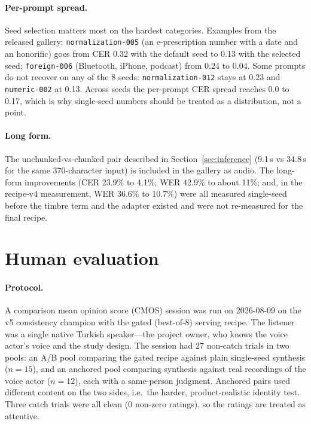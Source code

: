 \documentclass[10pt,twocolumn]{article}
\newcommand{\code}[1]{\texttt{#1}}
\begin{document}
\paragraph{Per-prompt spread.} Seed selection matters most on the hardest categories. Examples from the released gallery: \code{normalization-005} (an e-prescription number with a date and an honorific) goes from CER 0.32 with the default seed to 0.13 with the selected seed; \code{foreign-006} (Bluetooth, iPhone, podcast) from 0.24 to 0.04. Some prompts do not recover on any of the 8 seeds: \code{normalization-012} stays at 0.23 and \code{numeric-002} at 0.13. Across seeds the per-prompt CER spread reaches 0.0 to 0.17, which is why single-seed numbers should be treated as a distribution, not a point.

\paragraph{Long form.} The unchunked-vs-chunked pair described in Section~\ref{sec:inference} (9.1\,s vs 34.8\,s for the same 370-character input) is included in the gallery as audio. The long-form improvements (CER 23.9\% to 4.1\%; WER 42.9\% to about 11\%; and, in the recipe-v4 measurement, WER 36.6\% to 10.7\%) were all measured single-seed before the timbre term and the adapter existed and were not re-measured for the final recipe.

\section{Human evaluation}
\label{sec:human}

\paragraph{Protocol.} A comparison mean opinion score (CMOS) session was run on 2026-08-09 on the v5 consistency champion with the gated (best-of-8) serving recipe. The listener was a single native Turkish speaker---the project owner, who knows the voice actor's voice and the study design. The session had 27 non-catch trials in two pools: an A/B pool comparing the gated recipe against plain single-seed synthesis ($n=15$), and an anchored pool comparing synthesis against real recordings of the voice actor ($n=12$), each with a same-person judgment. Anchored pairs used different content on the two sides, i.e.\ the harder, product-realistic identity test. Three catch trials were all clean (0 non-zero ratings), so the ratings are treated as attentive.
\end{document}
